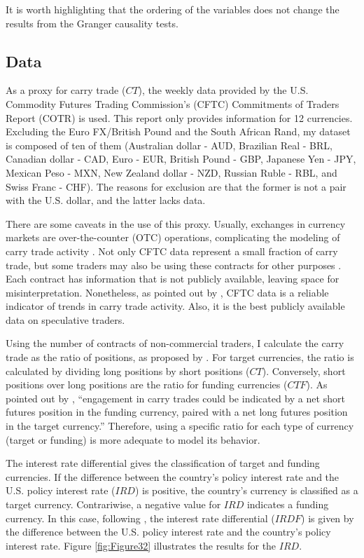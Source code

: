\documentclass[a4paper, twoside]{templates/ociamthesis}
\begin{document}
It is worth highlighting that the ordering of the variables does not change the results from the Granger causality tests.

\hypertarget{threetwotwo}{%
\subsection{Data}\label{threetwotwo}}

As a proxy for carry trade (\(CT\)), the weekly data provided by the U.S. Commodity Futures Trading Commission's (CFTC) Commitments of Traders Report (COTR) is used. This report only provides information for 12 currencies. Excluding the Euro FX/British Pound and the South African Rand, my dataset is composed of ten of them (Australian dollar - AUD, Brazilian Real - BRL, Canadian dollar - CAD, Euro - EUR, British Pound - GBP, Japanese Yen - JPY, Mexican Peso - MXN, New Zealand dollar - NZD, Russian Ruble - RBL, and Swiss Franc - CHF). The reasons for exclusion are that the former is not a pair with the U.S. dollar, and the latter lacks data.

There are some caveats in the use of this proxy. Usually, exchanges in currency markets are over-the-counter (OTC) operations, complicating the modeling of carry trade activity \autocite{galati2007,gubler2014}. Not only CFTC data represent a small fraction of carry trade, but some traders may also be using these contracts for other purposes \autocite{curcuru2011}. Each contract has information that is not publicly available, leaving space for misinterpretation. Nonetheless, as pointed out by \textcite{bankforinternationalsettlements2015}, CFTC data is a reliable indicator of trends in carry trade activity. Also, it is the best publicly available data on speculative traders.

Using the number of contracts of non-commercial traders, I calculate the carry trade as the ratio of positions, as proposed by \textcite{nishigaki2007}. For target currencies, the ratio is calculated by dividing long positions by short positions (\(CT\)). Conversely, short positions over long positions are the ratio for funding currencies (\(CTF\)). As pointed out by \textcite[ 438]{curcuru2011}, ``engagement in carry trades could be indicated by a net short futures position in the funding currency, paired with a net long futures position in the target currency.'' Therefore, using a specific ratio for each type of currency (target or funding) is more adequate to model its behavior.

The interest rate differential gives the classification of target and funding currencies. If the difference between the country's policy interest rate and the U.S. policy interest rate (\(IRD\)) is positive, the country's currency is classified as a target currency. Contrariwise, a negative value for \(IRD\) indicates a funding currency. In this case, following \textcite{gubler2014}, the interest rate differential (\(IRDF\)) is given by the difference between the U.S. policy interest rate and the country's policy interest rate. Figure \ref{fig:Figure32} illustrates the results for the \(IRD\).
\end{document}

